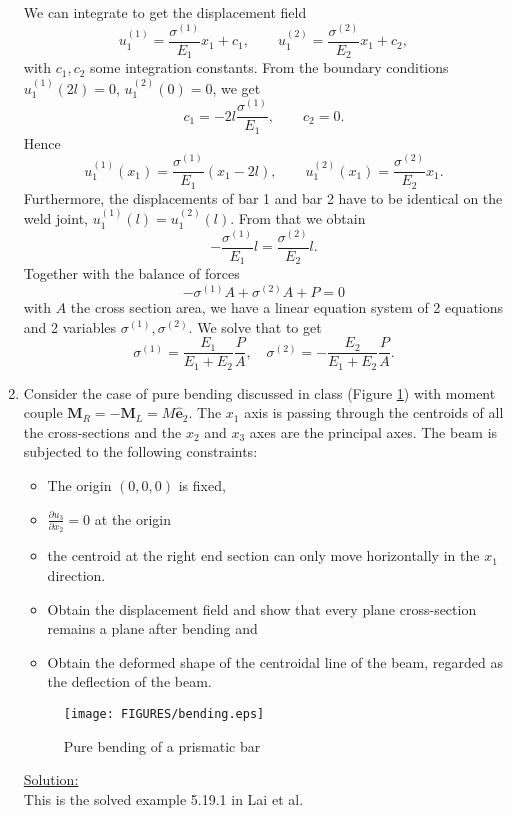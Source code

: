\documentclass{article}
\newcommand{\ee}{\end{equation}}
\newcommand{\be}{\begin{equation}}
\newcommand{\bi}{\begin{itemize}}
\newcommand{\ei}{\end{itemize}}
\newcommand{\pa}{\partial}
\newcommand{\bs}{\boldsymbol}
\begin{document}
\begin{enumerate}
We can integrate to get the displacement field
\be
u_1^{(1)} = \frac{\sigma^{(1)}}{E_1}x_1 + c_1, \qquad u_1^{(2)} = \frac{\sigma^{(2)}}{E_2}x_1 + c_2,
\ee
with $c_1, c_2$ some integration constants. From the boundary conditions $u_1^{(1)}(2l) = 0$, $u_1^{(2)}(0) = 0$, we get
\be
c_1 = -2l \frac{\sigma^{(1)}}{E_1}, \qquad c_2 = 0.
\ee
Hence
\be
u_1^{(1)}(x_1) = \frac{\sigma^{(1)}}{E_1}(x_1 - 2l), \qquad u_1^{(2)}(x_1) = \frac{\sigma^{(2)}}{E_2}x_1.
\ee
Furthermore, the displacements of bar 1 and bar 2 have to be identical on the weld joint, $u_1^{(1)}(l) = u_1^{(2)}(l)$. From that we obtain
\be
-\frac{\sigma^{(1)}}{E_1}l = \frac{\sigma^{(2)}}{E_2}l.
\ee
Together with the balance of forces
\be
-\sigma^{(1)}A + \sigma^{(2)}A + P = 0
\ee
with $A$ the cross section area, we have a linear equation system of 2 equations and 2 variables $\sigma^{(1)}, \sigma^{(2)}$. We solve that to get
\be
\sigma^{(1)}=\frac{E_1}{E_1+E_2} \frac{P}{A}, \quad \sigma^{(2)}=-\frac{E_2}{E_1+E_2} \frac{P}{A}.
\ee



\item Consider the case of pure bending discussed in class (Figure \ref{fig:pb}) with moment couple $\bs{M}_R=-\bs{M}_L=M\hat{\bs{e}}_2$. The  $x_1$ axis is passing
through the centroids of all the cross-sections  and the  $x_2$ and $x_3$ axes are the principal axes. The beam is subjected to the following constraints: 
\bi
\item  The origin $(0,0,0)$ is fixed, 
\item $\frac{\pa u_3}{\pa x_2}=0$ at the origin
\item  the centroid at the right end section can only move horizontally in the $x_1$ direction. \ei
\bi
\item Obtain the displacement field and show that every plane cross-section remains a plane after bending and 
\item Obtain the deformed shape of the centroidal line of the beam, regarded as the deflection of the beam.
\ei
\begin{figure}[!h]
\centering
{}
 \texttt{[image: FIGURES/bending.eps]}
\caption{Pure bending of a prismatic bar}
\label{fig:pb}
\end{figure}

\underline{Solution:} \\
This is the solved example 5.19.1 in Lai et al.


\end{enumerate}
\end{document}
